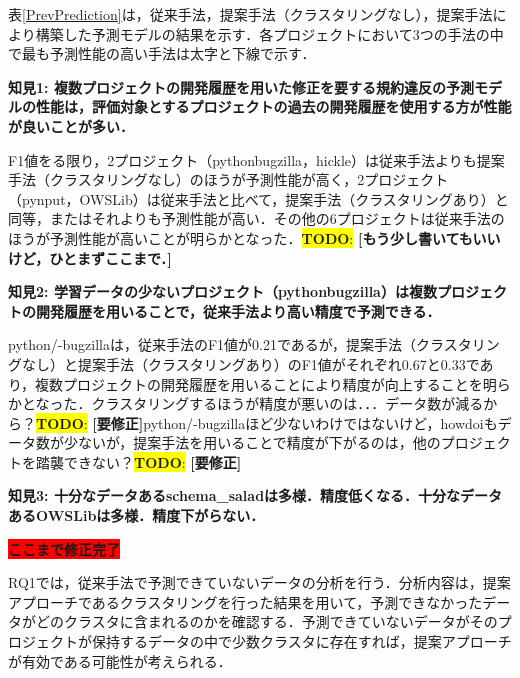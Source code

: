 \documentclass[T,J]{fose} %
\newcommand{\todo}[1]{\colorbox{yellow}{{\bf TODO}:}{\color{red} {\textbf{[#1]}}}}
\begin{document}
表\ref{PrevPrediction}は，従来手法，提案手法（クラスタリングなし），提案手法により構築した予測モデルの結果を示す．各プロジェクトにおいて3つの手法の中で最も予測性能の高い手法は太字と下線で示す．

\noindent\textbf{知見1: 複数プロジェクトの開発履歴を用いた修正を要する規約違反の予測モデルの性能は，評価対象とするプロジェクトの過去の開発履歴を使用する方が性能が良いことが多い．}

F1値をる限り，2プロジェクト（python\-bugzilla，hickle）は従来手法よりも提案手法（クラスタリングなし）のほうが予測性能が高く，2プロジェクト（pynput，OWSLib）は従来手法と比べて，提案手法（クラスタリングあり）と同等，またはそれよりも予測性能が高い．その他の6プロジェクトは従来手法のほうが予測性能が高いことが明らかとなった．\todo{もう少し書いてもいいけど，ひとまずここまで．}

\noindent\textbf{知見2: 学習データの少ないプロジェクト（python\-bugzilla）は複数プロジェクトの開発履歴を用いることで，従来手法より高い精度で予測できる．}

python/-bugzillaは，従来手法のF1値が0.21であるが，提案手法（クラスタリングなし）と提案手法（クラスタリングあり）のF1値がそれぞれ0.67と0.33であり，複数プロジェクトの開発履歴を用いることにより精度が向上することを明らかとなった．クラスタリングするほうが精度が悪いのは．．．データ数が減るから？\todo{要修正}python/-bugzillaほど少ないわけではないけど，howdoiもデータ数が少ないが，提案手法を用いることで精度が下がるのは，他のプロジェクトを踏襲できない？\todo{要修正}

\noindent\textbf{知見3: 十分なデータあるschema\_saladは多様．精度低くなる．十分なデータあるOWSLibは多様．精度下がらない．}

\colorbox{red}{{\bf ここまで修正完了}}



RQ1では，従来手法で予測できていないデータの分析を行う．分析内容は，提案アプローチであるクラスタリングを行った結果を用いて，予測できなかったデータがどのクラスタに含まれるのかを確認する．予測できていないデータがそのプロジェクトが保持するデータの中で少数クラスタに存在すれば，提案アプローチが有効である可能性が考えられる．
\end{document}
